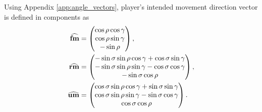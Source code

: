 Using Appendix \ref{app:angle_vectors}, player's intended movement direction vector is defined in components as
\begin{gather}
\begin{aligned}
\label{eq:fm_rm_um}
\tuvec*{\fmove} &=
\begin{pmatrix}
	\cos\rho\cos\gamma\\
	\cos\rho\sin\gamma\\
	-\sin\rho
\end{pmatrix},\\
\tuvec*{\rmove} &=
\begin{pmatrix}
	-\sin\sigma\sin\rho\cos\gamma + \cos\sigma\sin\gamma\\
	-\sin\sigma\sin\rho\sin\gamma - \cos\sigma\cos\gamma\\
	-\sin\sigma\cos\rho
\end{pmatrix},\\
\tuvec*{\umove} &=
\begin{pmatrix}
	\cos\sigma\sin\rho\cos\gamma + \sin\sigma\sin\gamma\\
	\cos\sigma\sin\rho\sin\gamma - \sin\sigma\cos\gamma\\
	\cos\sigma\cos\rho
\end{pmatrix}.
\end{aligned}
\end{gather}


